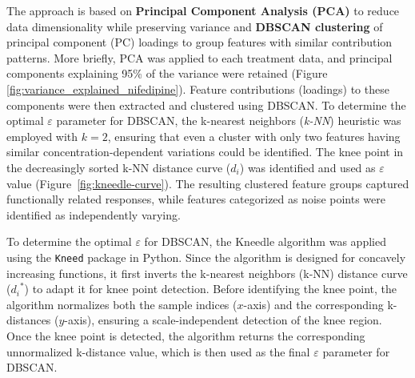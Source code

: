 \documentclass{report}
\begin{document}
        
        The approach is based on \textbf{Principal Component Analysis (PCA)} to reduce data dimensionality while preserving variance and \textbf{DBSCAN clustering} of principal component (PC) loadings to group features with similar contribution patterns. More briefly, PCA was applied to each treatment data, and principal components explaining 95\% of the variance were retained (Figure \ref{fig:variance_explained_nifedipine}). Feature contributions (loadings) to these components were then extracted and clustered using DBSCAN. To determine the optimal \(\varepsilon\) parameter for DBSCAN, the k-nearest neighbors (\textit{k-NN}) heuristic was employed with \(k = 2\), ensuring that even a cluster with only two features having similar concentration-dependent variations could be identified. The knee point in the decreasingly sorted k-NN distance curve ($d_i$) was identified and used as \(\varepsilon\) value (Figure~\ref{fig:kneedle-curve}). The resulting clustered feature groups captured functionally related responses, while features categorized as noise points were identified as independently varying.
        
        To determine the optimal \(\varepsilon\) for DBSCAN, the Kneedle algorithm \cite{kneedle} was applied using the \texttt{Kneed} \cite{arvkevi_kneed} package in Python. Since the algorithm is designed for concavely increasing functions, it first inverts the k-nearest neighbors (k-NN) distance curve (${d_i}^{*}$) to adapt it for knee point detection. Before identifying the knee point, the algorithm normalizes both the sample indices (\(x\)-axis) and the corresponding k-distances (\(y\)-axis), ensuring a scale-independent detection of the knee region. Once the knee point is detected, the algorithm returns the corresponding unnormalized k-distance value, which is then used as the final \(\varepsilon\) parameter for DBSCAN. 
        
\end{document}
